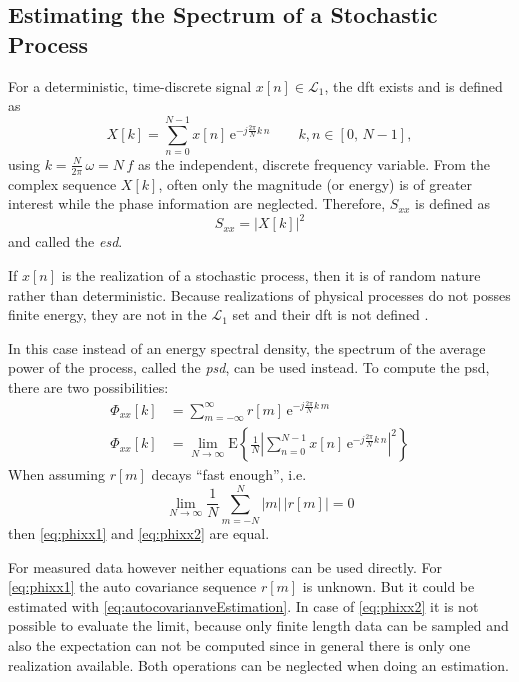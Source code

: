 \subsection{Estimating the Spectrum of a Stochastic Process}
For a deterministic, time-discrete signal $x[n] \in \mathcal{L}_1$, the \gls{dft} exists\cite{Lapidoth2019} and is defined as
\begin{equation}
X[k] = \sum_{n=0}^{N-1} x[n]\,\text{e}^{-j\frac{2\pi}{N}k\,n}\qquad k,n \in [0,\,N-1],
\end{equation}
using $k=\frac{N}{2\pi}\,\omega = N\,f$ as the independent, discrete frequency variable. 
From the complex sequence $X[k]$, often only the magnitude (or energy) is of greater interest while the phase information are neglected. 
Therefore, $S_{xx}$ is defined as
\begin{equation}
S_{xx} = \left|X[k]\right|^2
\end{equation}
and called the \textit{\gls{esd}}.

If $x[n]$ is the realization of a stochastic process, then it is of random nature rather than deterministic.
Because realizations of physical processes do not posses finite energy, they are not in the $\mathcal{L}_1$ set and their \gls{dft} is not defined \cite[p.~5]{Stoica1997}.

In this case instead of an energy spectral density, the spectrum of the average power of the process, called the \textit{\gls{psd}}, can be used instead.
To compute the \gls{psd}, there are two possibilities:
\begin{align}
\Phi_{xx}[k] &= \sum_{m=-\infty}^{\infty} r[m]\,\text{e}^{-j\frac{2\pi}{N}k\,m} \label{eq:phixx1}\\
\Phi_{xx}[k] &= \lim_{N\rightarrow\infty} \text{E}\left\{\frac{1}{N}\left|\sum_{n=0}^{N-1} x[n]\,\text{e}^{-j\frac{2\pi}{N}k\,n}\right|^2 \right\} \label{eq:phixx2}
\end{align}
When assuming $r[m]$ decays ``fast enough'', i.e.
\begin{equation}
\lim_{N\rightarrow\infty} \frac{1}{N} \sum_{m=-N}^{N} |m|\,\left|r[m]\right| = 0
\end{equation}
then \autoref{eq:phixx1} and \autoref{eq:phixx2} are equal\cite[p.~7]{Stoica1997}.

For measured data however neither equations can be used directly.
For \autoref{eq:phixx1} the auto covariance sequence $r[m]$ is unknown.
But it could be estimated with \autoref{eq:autocovarianveEstimation}. In case of \autoref{eq:phixx2} it is not possible to evaluate the limit, because only finite length data can be sampled and also the expectation can not be computed since in general there is only one realization available. Both operations can be neglected when doing an estimation.

